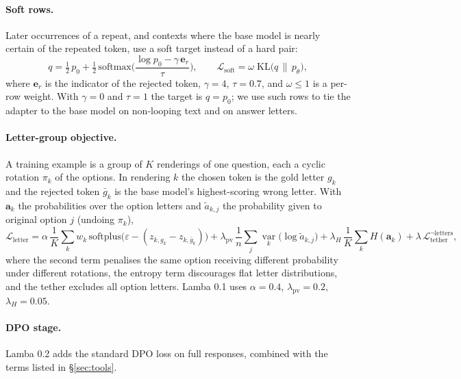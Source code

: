 \documentclass[11pt]{article}
\begin{document}
\paragraph{Soft rows.} Later occurrences of a repeat, and contexts where the base model is nearly certain of the repeated token, use a soft target instead of a hard pair:
\begin{equation}
q = \tfrac12\,p_0 + \tfrac12\,\mathrm{softmax}\!\Big(\frac{\log p_0 - \gamma\,\bm{e}_r}{\tau}\Big), \qquad \mathcal{L}_{\text{soft}} = \omega\;\mathrm{KL}\big(q \,\|\, p_\theta\big),
\label{eq:soft}
\end{equation}
where $\bm{e}_r$ is the indicator of the rejected token, $\gamma=4$, $\tau=0.7$, and $\omega \leq 1$ is a per-row weight. With $\gamma=0$ and $\tau=1$ the target is $q = p_0$; we use such rows to tie the adapter to the base model on non-looping text and on answer letters.

\paragraph{Letter-group objective.} A training example is a group of $K$ renderings of one question, each a cyclic rotation $\pi_k$ of the options. In rendering $k$ the chosen token is the gold letter $g_k$ and the rejected token $\bar{g}_k$ is the base model's highest-scoring wrong letter. With $\bm{a}_k$ the probabilities over the option letters and $\tilde a_{k,j}$ the probability given to original option $j$ (undoing $\pi_k$),
\begin{equation}
\mathcal{L}_{\text{letter}} = \alpha\,\frac1K\sum_k w_k\,\mathrm{softplus}\big(\varepsilon - (z_{k,g_k} - z_{k,\bar g_k})\big)
+ \lambda_{\text{pv}}\,\frac1n\sum_{j}\operatorname*{var}_k\big(\log \tilde a_{k,j}\big)
+ \lambda_H\,\frac1K\sum_k H(\bm{a}_k)
+ \lambda\,\mathcal{L}_{\text{tether}}^{\neg\text{letters}},
\label{eq:letter}
\end{equation}
where the second term penalises the same option receiving different probability under different rotations, the entropy term discourages flat letter distributions, and the tether excludes all option letters. Lamba 0.1 uses $\alpha = 0.4$, $\lambda_{\text{pv}} = 0.2$, $\lambda_H = 0.05$.

\paragraph{DPO stage.} Lamba 0.2 adds the standard DPO loss \citep{rafailov2023dpo} on full responses, combined with the terms listed in \S\ref{sec:tools}.
\end{document}
